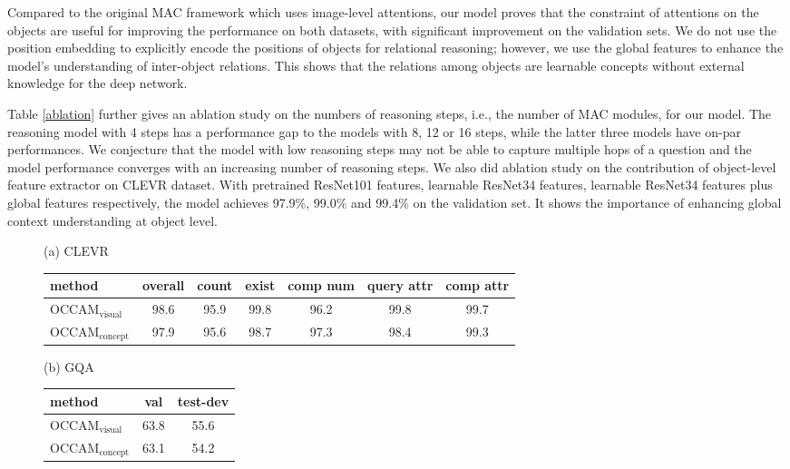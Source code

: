\documentclass[10pt,twocolumn,letterpaper]{article}
\begin{document}
Compared to the original MAC \cite{hudson2018compositional} framework which uses image-level attentions, our model proves that the constraint of attentions on the objects are useful for improving the performance on both datasets, with significant improvement on the validation sets. We do not use the position embedding to explicitly encode the positions of objects for relational reasoning; however, we use the global features to enhance the model's understanding of inter-object relations. This shows that the relations among objects are learnable concepts without external knowledge for the deep network. 

Table \ref{ablation} further gives an ablation study on the numbers of reasoning steps, i.e., the number of MAC modules, for our model. The reasoning model with 4 steps has a performance gap to the models with 8, 12 or 16 steps, while the latter three models have on-par performances. We conjecture that the model with low reasoning steps may not be able to capture multiple hops of a question and the model performance converges with an increasing number of reasoning steps. We also did ablation study on the contribution of object-level feature extractor on CLEVR dataset. With pretrained ResNet101 features, learnable ResNet34 features, learnable ResNet34 features plus global features respectively, the model achieves 97.9\%, 99.0\% and 99.4\% on the validation set. It shows the importance of enhancing global context understanding at object level.


\begin{figure*}
\vspace{-2mm}
\label{obj_conc_comp}
\begin{minipage}[b]{0.67\textwidth}
\small
\centering
(a) CLEVR
\begin{tabular}{l|c|ccccc}
        \toprule
         method & overall & count & exist & comp num & query attr & comp attr  \\
         \midrule
         OCCAM$_{\textrm{visual}}$& 98.6 & 95.9 & 99.8 & 96.2 & 99.8 & 99.7 \\
         
         OCCAM$_{\textrm{concept}}$ & 97.9&95.6&98.7&97.3&98.4&99.3\\
         \bottomrule
    \end{tabular}
  \end{minipage}
  \begin{minipage}[b]{0.3\textwidth}
  \small
    \centering
    (b) GQA
    \begin{tabular}{l|c|c}
        \toprule
         method & val & test-dev  \\
         \midrule
         OCCAM$_{\textrm{visual}}$ & 63.8 & 55.6 \\
         OCCAM$_{\textrm{concept}}$ & 63.1 & 54.2\\
         \bottomrule
    \end{tabular}
    \end{minipage}
    \vspace{-3mm}
  \end{figure*}
\end{document}
